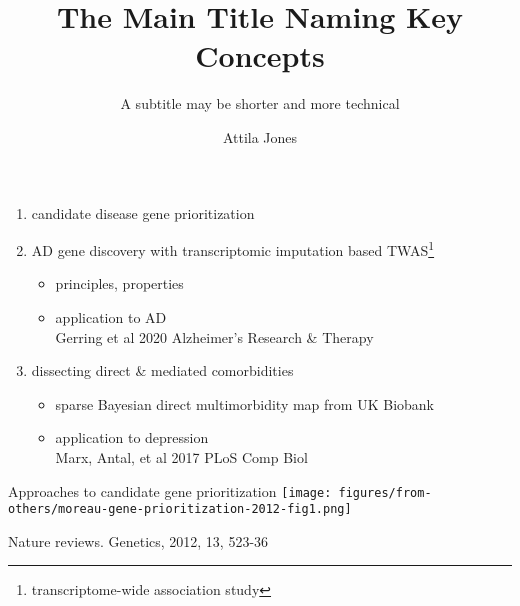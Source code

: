 \documentclass{beamer}
\title{The Main Title Naming Key Concepts}
\subtitle{A subtitle may be shorter and more technical}
\author{Attila Jones}
\date{}
\begin{document}
\begin{frame}
\begin{enumerate}
\item candidate disease gene prioritization
\item AD gene discovery with transcriptomic imputation based TWAS\footnote{transcriptome-wide association study}
	\begin{itemize}
		\item principles, properties
		\item application to AD\\\tiny{Gerring et al 2020 Alzheimer's Research \& Therapy}
	\end{itemize}
\item dissecting direct \& mediated comorbidities
\begin{itemize}
\item sparse Bayesian direct multimorbidity map from UK Biobank
\item application to depression\\
	\tiny{Marx, Antal, et al 2017 PLoS Comp Biol}
\end{itemize}
\end{enumerate}
\end{frame}

\begin{frame}{Approaches to candidate gene prioritization}
\texttt{[image: figures/from-others/moreau-gene-prioritization-2012-fig1.png]}

\tiny{Nature reviews. Genetics, 2012, 13, 523-36}
\end{frame}
\end{document}
